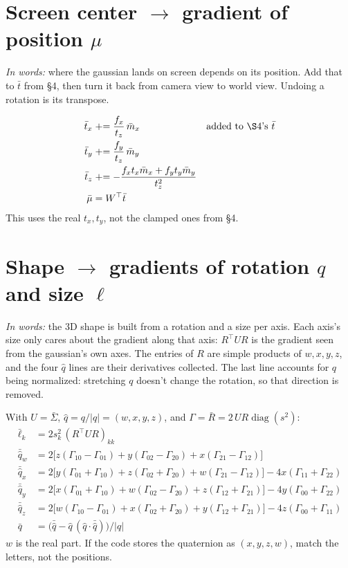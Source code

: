 \documentclass[11pt]{article}
\newcommand{\T}{^{\top}}
\newcommand{\diag}{\operatorname{diag}}
\newcommand{\words}[1]{\textit{In words:} #1\par}
\begin{document}
\section{Screen center \texorpdfstring{$\to$}{->} gradient of position \texorpdfstring{$\mu$}{mu}}

\words{where the gaussian lands on screen depends on its position. Add that to $\bar t$ from \S4, then turn it back from camera view to world view. Undoing a rotation is its transpose.}
\begin{align*}
\bar t_x &\mathrel{+}= \frac{f_x}{t_z}\,\bar m_x && \text{added to \S4's } \bar t \\
\bar t_y &\mathrel{+}= \frac{f_y}{t_z}\,\bar m_y \\
\bar t_z &\mathrel{+}= -\frac{f_x t_x \bar m_x + f_y t_y \bar m_y}{t_z^2} \\
\bar\mu &= W\T \bar t
\end{align*}
This uses the real $t_x, t_y$, not the clamped ones from \S4.

\section{Shape \texorpdfstring{$\to$}{->} gradients of rotation $q$ and size \texorpdfstring{$\ell$}{l}}

\words{the 3D shape is built from a rotation and a size per axis. Each axis's size only cares about the gradient along that axis: $R\T U R$ is the gradient seen from the gaussian's own axes. The entries of $R$ are simple products of $w, x, y, z$, and the four $\hat q$ lines are their derivatives collected. The last line accounts for $q$ being normalized: stretching $q$ doesn't change the rotation, so that direction is removed.}

With $U = \bar\Sigma$, $\hat q = q/|q| = (w, x, y, z)$, and $\Gamma = \bar R = 2\, U R \diag(s^2)$:
\begin{align*}
\bar\ell_k &= 2 s_k^2\, (R\T U R)_{kk} \\
\bar{\hat q}_w &= 2\bigl[z(\Gamma_{10}-\Gamma_{01}) + y(\Gamma_{02}-\Gamma_{20}) + x(\Gamma_{21}-\Gamma_{12})\bigr] \\
\bar{\hat q}_x &= 2\bigl[y(\Gamma_{01}+\Gamma_{10}) + z(\Gamma_{02}+\Gamma_{20}) + w(\Gamma_{21}-\Gamma_{12})\bigr] - 4x(\Gamma_{11}+\Gamma_{22}) \\
\bar{\hat q}_y &= 2\bigl[x(\Gamma_{01}+\Gamma_{10}) + w(\Gamma_{02}-\Gamma_{20}) + z(\Gamma_{12}+\Gamma_{21})\bigr] - 4y(\Gamma_{00}+\Gamma_{22}) \\
\bar{\hat q}_z &= 2\bigl[w(\Gamma_{10}-\Gamma_{01}) + x(\Gamma_{02}+\Gamma_{20}) + y(\Gamma_{12}+\Gamma_{21})\bigr] - 4z(\Gamma_{00}+\Gamma_{11}) \\
\bar q &= \bigl(\bar{\hat q} - \hat q\,(\hat q\cdot\bar{\hat q})\bigr)/|q|
\end{align*}
$w$ is the real part. If the code stores the quaternion as $(x, y, z, w)$, match the letters, not the positions.
\end{document}
